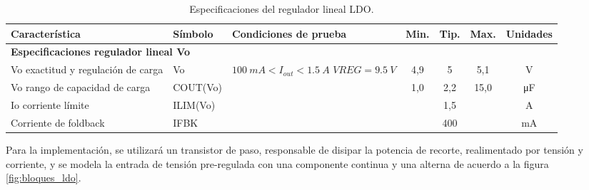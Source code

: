 \documentclass[]{article}
\begin{document}
	\begin{table}[h]
		\centering
		\renewcommand{\arraystretch}{1.5}
		\begin{tabular}{|p{3cm}|l|p{5cm}|c|c|c|c|}
			\hline
			\textbf{Característica} & \textbf{Símbolo} & \textbf{Condiciones de prueba} & \textbf{Min.} & \textbf{Tip.} & \textbf{Max.} & \textbf{Unidades} \\
			\hline
			
			\multicolumn{7}{|l|}{\textbf{Especificaciones regulador lineal Vo}} \\
			\hline
			
			Vo exactitud y regulación de carga & Vo & $\SI{100}{mA} < I_{out} < \SI{1.5}{A}$ \break $VREG = \SI{9.5}{V}$ & 4,9 & 5 & 5,1 & V \\
			\hline
			
			Vo rango de capacidad de carga & COUT(Vo) &  & 1,0 & 2,2 & 15,0 & \si{\micro\farad} \\
			\hline
			
			Io corriente límite & ILIM(Vo) &  &  & 1,5 &  & A \\
			\hline
			
			Corriente de foldback & IFBK &  &  & 400 &  & \si{mA} \\
			\hline
		
		\end{tabular}
		
		\caption{Especificaciones del regulador lineal LDO.}
		\label{tabla:especificaciones_ldo}
	\end{table}
	
Para la implementación, se utilizará un transistor de paso, responsable de disipar la potencia de recorte, realimentado por tensión y corriente, y se modela la entrada de tensión pre-regulada con una componente continua y una alterna de acuerdo a la figura \ref{fig:bloques_ldo}.
\end{document}

